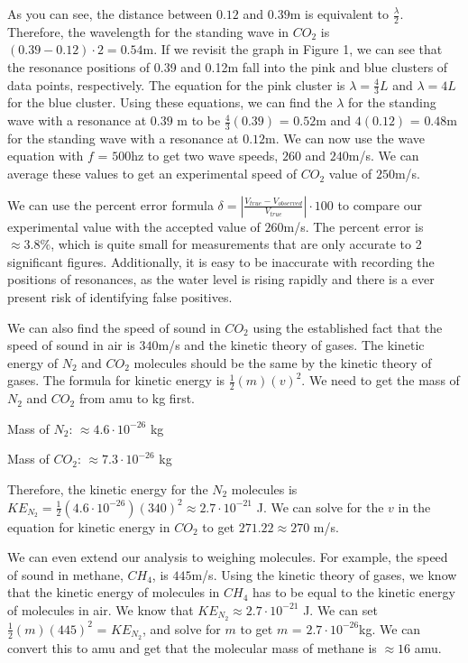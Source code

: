 \documentclass[11pt,twoside]{article}
\begin{document}
As you can see, the distance between $0.12$ and $0.39$m is equivalent to $\frac{\lambda}{2}$. Therefore, the wavelength for the standing wave in $CO_2$ is $(0.39 - 0.12) \cdot 2 = 0.54$m. If we revisit the graph in Figure 1, we can see that the resonance positions of 0.39 and 0.12m fall into the pink and blue clusters of data points, respectively. The equation for the pink cluster is $\lambda = \frac{4}{3}L$ and $\lambda = 4L$ for the blue cluster. Using these equations, we can find the $\lambda$ for the standing wave with a resonance at $0.39$ m to be $\frac{4}{3}(0.39)$ = $0.52$m and $4(0.12)$ = $0.48$m for the standing wave with a resonance at $0.12$m. We can now use the wave equation with $f$ = $500$hz to get two wave speeds, $260$ and $240$m/s. We can average these values to get an experimental speed of $CO_2$ value of $250$m/s. 

We can use the percent error formula 
$\delta = |\frac{V_{true} - V_{observed}}{V_{true}}| \cdot 100$ to compare our experimental value with the accepted value of $260$m/s. The percent error is $\approx 3.8\%$, which is quite small for measurements that are only accurate to 2 significant figures. Additionally, it is easy to be inaccurate with recording the positions of resonances, as the water level is rising rapidly and there is a ever present risk of identifying false positives. 

We can also find the speed of sound in $CO_2$ using the established fact that the speed of sound in air is $340$m/s and the kinetic theory of gases. The kinetic energy of $N_2$ and $CO_2$ molecules should be the same by the kinetic theory of gases. The formula for kinetic energy is $\frac{1}{2}(m)(v)^2$. We need to get the mass of $N_2$ and $CO_2$ from amu to kg first. 

Mass of $N_2$: $\approx 4.6 \cdot 10^{-26}$ kg

Mass of $CO_2$: $\approx 7.3 \cdot 10^{-26}$ kg 

Therefore, the kinetic energy for the $N_2$ molecules is $KE_{N_2} = \frac{1}{2}(4.6 \cdot 10^{-26})(340)^2 \approx 2.7 \cdot 10^{-21}$ J. We can solve for the $v$ in the equation for kinetic energy in $CO_2$ to get $271.22 \approx 270$ m/s.

We can even extend our analysis to weighing molecules. For example, the speed of sound in methane, $CH_4$, is $445$m/s. Using the kinetic theory of gases, we know that the kinetic energy of molecules in $CH_4$ has to be equal to the kinetic energy of molecules in air. We know that $KE_{N_2} \approx 2.7 \cdot 10^{-21}$ J. We can set $\frac{1}{2}(m)(445)^2$ = $KE_{N_2}$, and solve for $m$ to get $m$ = $2.7 \cdot 10^{-26}$kg. We can convert this to amu and get that the molecular mass of methane is $\approx 16$ amu.
\end{document}
